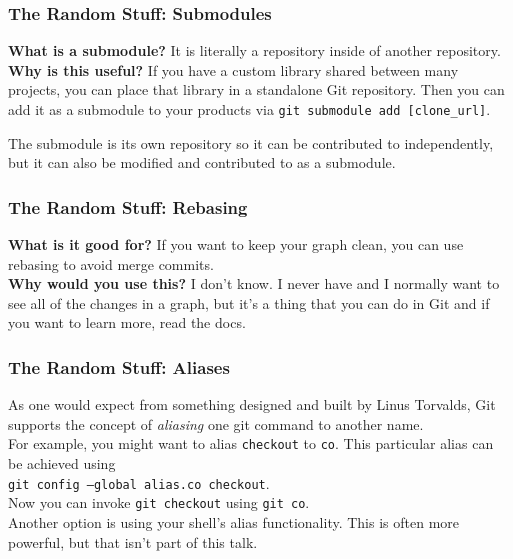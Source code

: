 \documentclass{beeper}
\begin{document}
\begin{frame}
    \frametitle{The Random Stuff: Submodules}

    \textbf{What is a submodule?} It is literally a repository inside of another repository.\\

    \textbf{Why is this useful?} If you have a custom library shared between many projects, you can
    place that library in a standalone Git repository. Then you can add it as a submodule to your
    products via \texttt{git submodule add [clone\_url]}.

    The submodule is its own repository so it can be contributed to independently, but it can also
    be modified and contributed to as a submodule.
\end{frame}

\begin{frame}
    \frametitle{The Random Stuff: Rebasing}

    \textbf{What is it good for?} If you want to keep your graph clean, you can use rebasing to
    avoid merge commits.\\

    \textbf{Why would you use this?} I don't know. I never have and I normally want to see all of
    the changes in a graph, but it's a thing that you can do in Git and if you want to learn more,
    read the docs.
\end{frame}

\begin{frame}
    \frametitle{The Random Stuff: Aliases}

    As one would expect from something designed and built by Linus Torvalds, Git supports the
    concept of \textit{aliasing} one git command to another name.\\

    For example, you might want to alias \texttt{checkout} to \texttt{co}. This particular alias can
    be achieved using \\ \texttt{git config --global alias.co checkout}.\\

    Now you can invoke \texttt{git checkout} using \texttt{git co}.\\

    Another option is using your shell's alias functionality. This is often more powerful, but that
    isn't part of this talk.
\end{frame}
\end{document}
